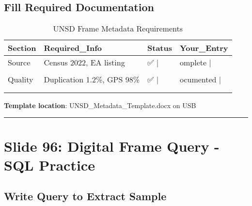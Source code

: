 \documentclass[
]{article}
\begin{document}
\subsection{Fill Required
Documentation}\label{fill-required-documentation}

\begin{longtable}[t]{llll}
\caption{\label{tab:metadata-template}UNSD Frame Metadata Requirements}\\
\toprule
Section & Required\_Info & Status & Your\_Entry\\
\midrule
Source & Census 2022, EA listing & ✅     | & omplete             |\\
\cellcolor[HTML]{fff3cd}{Coverage} & \cellcolor[HTML]{fff3cd}{93\% estimated, 85\% verified} & \cellcolor[HTML]{fff3cd}{⚠️} & \cellcolor[HTML]{fff3cd}{|Needs verification}\\
Quality & Duplication 1.2\%, GPS 98\% & ✅     | & ocumented           |\\
\cellcolor[HTML]{ffcccc}{Updates} & \cellcolor[HTML]{ffcccc}{None since 2022} & \cellcolor[HTML]{ffcccc}{❌     |} & \cellcolor[HTML]{ffcccc}{issing              |}\\
\cellcolor[HTML]{fff3cd}{Limitations} & \cellcolor[HTML]{fff3cd}{Urban fringe gaps, seasonal variation} & \cellcolor[HTML]{fff3cd}{⚠️} & \cellcolor[HTML]{fff3cd}{|Partially documented}\\
\bottomrule
\end{longtable}

\textbf{Template location}: UNSD\_Metadata\_Template.docx on USB

\begin{center}\rule{0.5\linewidth}{0.5pt}\end{center}

\section{Slide 96: Digital Frame Query - SQL
Practice}\label{slide-96-digital-frame-query---sql-practice}

\subsection{Write Query to Extract
Sample}\label{write-query-to-extract-sample}
\end{document}
